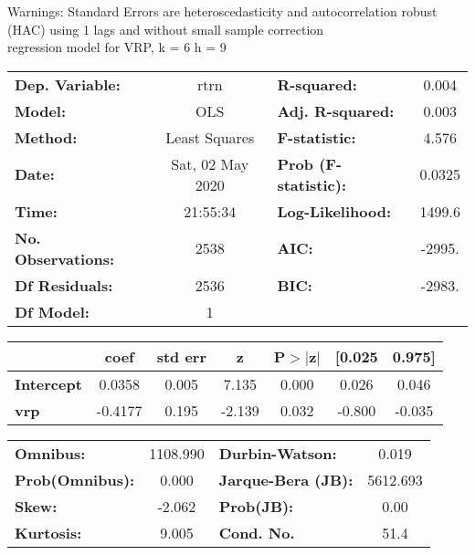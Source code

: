 Warnings: \newline
 [1] Standard Errors are heteroscedasticity and autocorrelation robust (HAC) using 1 lags and without small sample correction\\ 

regression model for VRP, k = 6 h = 9\begin{center}
\begin{tabular}{lclc}
\toprule
\textbf{Dep. Variable:}    &       rtrn       & \textbf{  R-squared:         } &     0.004   \\
\textbf{Model:}            &       OLS        & \textbf{  Adj. R-squared:    } &     0.003   \\
\textbf{Method:}           &  Least Squares   & \textbf{  F-statistic:       } &     4.576   \\
\textbf{Date:}             & Sat, 02 May 2020 & \textbf{  Prob (F-statistic):} &   0.0325    \\
\textbf{Time:}             &     21:55:34     & \textbf{  Log-Likelihood:    } &    1499.6   \\
\textbf{No. Observations:} &        2538      & \textbf{  AIC:               } &    -2995.   \\
\textbf{Df Residuals:}     &        2536      & \textbf{  BIC:               } &    -2983.   \\
\textbf{Df Model:}         &           1      & \textbf{                     } &             \\
\bottomrule
\end{tabular}
\begin{tabular}{lcccccc}
                   & \textbf{coef} & \textbf{std err} & \textbf{z} & \textbf{P$> |$z$|$} & \textbf{[0.025} & \textbf{0.975]}  \\
\midrule
\textbf{Intercept} &       0.0358  &        0.005     &     7.135  &         0.000        &        0.026    &        0.046     \\
\textbf{vrp}       &      -0.4177  &        0.195     &    -2.139  &         0.032        &       -0.800    &       -0.035     \\
\bottomrule
\end{tabular}
\begin{tabular}{lclc}
\textbf{Omnibus:}       & 1108.990 & \textbf{  Durbin-Watson:     } &    0.019  \\
\textbf{Prob(Omnibus):} &   0.000  & \textbf{  Jarque-Bera (JB):  } & 5612.693  \\
\textbf{Skew:}          &  -2.062  & \textbf{  Prob(JB):          } &     0.00  \\
\textbf{Kurtosis:}      &   9.005  & \textbf{  Cond. No.          } &     51.4  \\
\bottomrule
\end{tabular}
\end{center}

